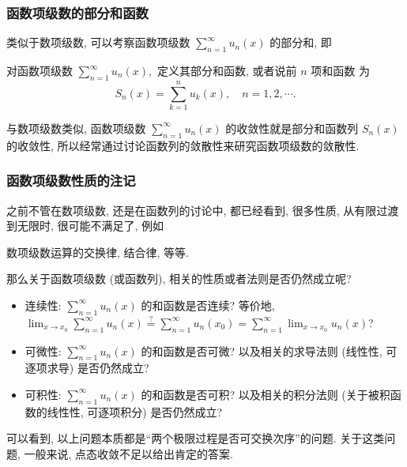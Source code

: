 
\begin{frame}
\frametitle{函数项级数的部分和函数}

类似于数项级数, 可以考察函数项级数 $\sum_{n=1}^\infty u_n(x)$ 的\alert{部分和}, 即
\begin{Def}[函数项级数的部分和函数]
对函数项级数 $\sum_{n=1}^\infty u_n(x),$ 定义其\alert{部分和函数, 或者说前 $n$ 项和函数} 为
\[
S_n(x) = \sum_{k=1}^n u_k(x), \quad n = 1, 2, \cdots.
\]
\end{Def}

\pause

\begin{remark}
与数项级数类似, 函数项级数 $\sum_{n=1}^\infty u_n(x)$ 的收敛性就是部分和函数列 $S_n(x)$ 的收敛性, 所以经常通过讨论函数列的敛散性来研究函数项级数的敛散性.
\end{remark}

\end{frame}


\begin{frame}
\frametitle{函数项级数性质的注记}

之前不管在数项级数, 还是在函数列的讨论中, 都已经看到, 很多性质, 从有限过渡到无限时, 很可能不满足了, 例如
\begin{center}
数项级数运算的交换律, 结合律, 等等.
\end{center}
\pause
那么关于函数项级数 (或函数列), 相关的性质或者法则是否仍然成立呢?
\begin{itemize}
\item 连续性: $\sum_{n=1}^\infty u_n(x)$ 的和函数是否连续? \pause 等价地, $\lim_{x \to x_0} \sum_{n=1}^\infty u_n(x) \stackrel{?}{=} \sum_{n=1}^\infty u_n(x_0) = \sum_{n=1}^\infty \lim_{x \to x_0} u_n(x)$?
\pause
\item 可微性: $\sum_{n=1}^\infty u_n(x)$ 的和函数是否可微? 以及相关的求导法则 (线性性, 可逐项求导) 是否仍然成立?
\pause
\item 可积性: $\sum_{n=1}^\infty u_n(x)$ 的和函数是否可积? 以及相关的积分法则 (关于被积函数的线性性, 可逐项积分) 是否仍然成立?
\end{itemize}

\pause

\begin{attnblock}
可以看到, 以上问题本质都是``两个极限过程是否可交换次序''的问题. \pause 关于这类问题, 一般来说, 点态收敛不足以给出肯定的答案.
\end{attnblock}

\end{frame}

